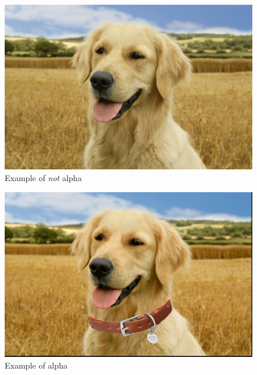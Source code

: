 \begin{frame}
  \begin{figure}
    \includegraphics[height=0.8\textheight]{fig/golden-retriever.jpg}
    \caption{Example of \emph{not} alpha}
  \end{figure}
\end{frame}

\begin{frame}
  \begin{figure}
    \includegraphics[height=0.8\textheight]{fig/golden-retriever-collar.jpg}
    \caption{Example of alpha}
  \end{figure}
\end{frame}

